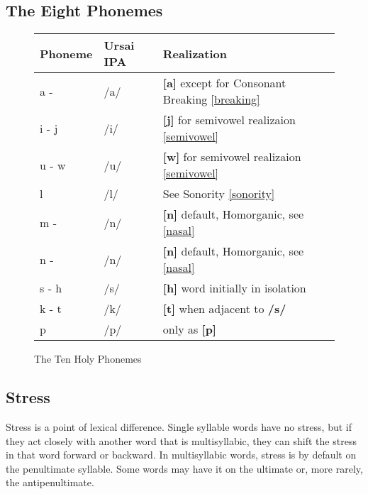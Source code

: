 \documentclass[11pt,letterpaper]{article}
\newcommand{\epsi}{\textipa{E}}
\newcommand{\engma}{\textipa{N}}
\newcommand{\inb}{\textipa{!b}}
\begin{document}
	\subsection{The Eight Phonemes}
		\begin{wrapfigure}{l}{0.65\textwidth}
  			\begin{tabular}{|l|l|l|}
  				\hline
  				Phoneme             & Ursai IPA & Realization \\ \hline \hline
  				a - \epsi           & /a/ & \textbf{[a]} except for Consonant Breaking \ref{breaking}\\
  				i - j               & /i/ & \textbf{[j]} for semivowel realizaion \ref{semivowel}   \\
  				u - w               & /u/ & \textbf{[w]} for semivowel realizaion \ref{semivowel}   \\
  				l                   & /l/ & See Sonority \ref{sonority} \\ 
  				m - \inb            & /n/ & \textbf{[n]} default, Homorganic, see \ref{nasal} \\
  				n - \engma          & /n/ & \textbf{[n]} default, Homorganic, see \ref{nasal} \\
  				s - h               & /s/ & \textbf{[h]} word initially in isolation \\
  				k - t               & /k/ & \textbf{[t]} when adjacent to \textbf{/s/} \\
  				p                   & /p/ & only as \textbf{[p]} \\ \hline
  			\end{tabular}
  			\caption{The Ten Holy Phonemes}
		\end{wrapfigure}
		\par
	\subsection{Stress}\label{stress}
	\par 
	Stress is a point of lexical difference.  Single syllable words have no stress, but if they act closely with another word that is multisyllabic, they can shift the stress in that word forward or backward.  In multisyllabic words, stress is by default on the penultimate syllable.  Some words may have it on the ultimate or, more rarely, the antipenultimate.
\end{document}
